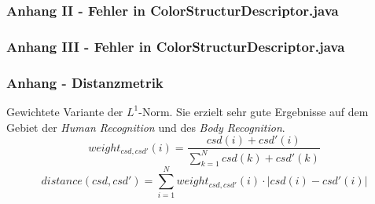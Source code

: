 \documentclass[11pt]{beamer}
\begin{document}
\begin{frame}
	\frametitle{Anhang II - Fehler in ColorStructurDescriptor.java}
	\scriptsize
	
\end{frame}

\begin{frame}
	\frametitle{Anhang III - Fehler in ColorStructurDescriptor.java}
	\scriptsize
	
\end{frame}

\begin{frame}
	\frametitle{Anhang  - Distanzmetrik}
		    Gewichtete Variante der $L^1$-Norm. Sie erzielt sehr gute Ergebnisse auf dem Gebiet der
    \emph{Human Recognition} und des \emph{Body Recognition}.
$$
  weight_{csd,csd'}(i) = \frac{csd(i) + csd'(i)}{\sum\limits_{k = 1}^N csd(k) + csd'(k)}
$$
$$
  distance(csd,csd') = \sum\limits_{i = 1}^N   weight_{csd,csd'}(i) \cdot |csd(i) - csd'(i)|
$$
\end{frame}
\end{document}
